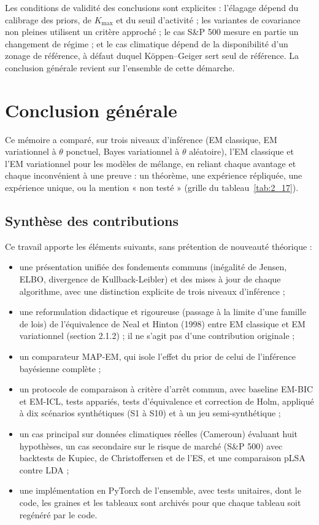 Les conditions de validité des conclusions sont explicites : l'élagage dépend du calibrage des priors, de $K_{\max}$ et du seuil d'activité ; les variantes de covariance non pleines utilisent un critère approché ; le cas S\&P 500 mesure en partie un changement de régime ; et le cas climatique dépend de la disponibilité d'un zonage de référence, à défaut duquel Köppen--Geiger sert seul de référence. La conclusion générale revient sur l'ensemble de cette démarche.


\chapter*{Conclusion générale}
Ce mémoire a comparé, sur trois niveaux d'inférence (EM classique, EM variationnel à $\theta$ ponctuel, Bayes variationnel à $\theta$ aléatoire), l'EM classique et l'EM variationnel pour les modèles de mélange, en reliant chaque avantage et chaque inconvénient à une preuve : un théorème, une expérience répliquée, une expérience unique, ou la mention « non testé » (grille du tableau~\ref{tab:2_17}).

\section*{Synthèse des contributions}
Ce travail apporte les éléments suivants, sans prétention de nouveauté théorique :

\begin{itemize}
\item une présentation unifiée des fondements communs (inégalité de Jensen, ELBO, divergence de Kullback-Leibler) et des mises à jour de chaque algorithme, avec une distinction explicite de trois niveaux d'inférence ;
\item une reformulation didactique et rigoureuse (passage à la limite d'une famille de lois) de l'équivalence de Neal et Hinton (1998) entre EM classique et EM variationnel (section 2.1.2) ; il ne s'agit pas d'une contribution originale ;
\item un comparateur MAP-EM, qui isole l'effet du prior de celui de l'inférence bayésienne complète ;
\item un protocole de comparaison à critère d'arrêt commun, avec baseline EM-BIC et EM-ICL, tests appariés, tests d'équivalence et correction de Holm, appliqué à dix scénarios synthétiques (S1 à S10) et à un jeu semi-synthétique ;
\item un cas principal sur données climatiques réelles (Cameroun) évaluant huit hypothèses, un cas secondaire sur le risque de marché (S\&P 500) avec backtests de Kupiec, de Christoffersen et de l'ES, et une comparaison pLSA contre LDA ;
\item une implémentation en PyTorch de l'ensemble, avec tests unitaires, dont le code, les graines et les tableaux sont archivés pour que chaque tableau soit regénéré par le code.
\end{itemize}

